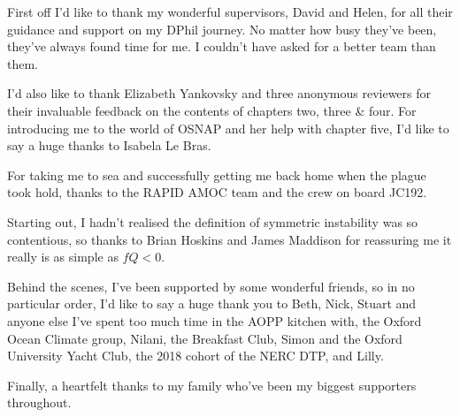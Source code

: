 \cleardoublepage
{}
{}
\begin{acknowledgements}
    \begin{spacing}{1.25}
    First off I'd like to thank my wonderful supervisors, David and Helen, for all their guidance and support on my DPhil journey. No matter how busy they've been, they've always found time for me. I couldn't have asked for a better team than them.

    I'd also like to thank Elizabeth Yankovsky and three anonymous reviewers for their invaluable feedback on the contents of chapters two, three \& four. For introducing me to the world of OSNAP and her help with chapter five, I'd like to say a huge thanks to Isabela Le Bras.

    For taking me to sea and successfully getting me back home when the plague took hold, thanks to the RAPID AMOC team and the crew on board JC192.

    Starting out, I hadn't realised the definition of symmetric instability was so contentious, so thanks to Brian Hoskins and James Maddison for reassuring me it really is as simple as $fQ < 0$.

    Behind the scenes, I've been supported by some wonderful friends, so in no particular order, I'd like to say a huge thank you to Beth, Nick, Stuart and anyone else I've spent too much time in the AOPP kitchen with, the Oxford Ocean Climate group, Nilani, the Breakfast Club, Simon and the Oxford University Yacht Club, the 2018 cohort of the NERC DTP, and Lilly.

    Finally, a heartfelt thanks to my family who've been my biggest supporters throughout.
    \end{spacing}
\end{acknowledgements}